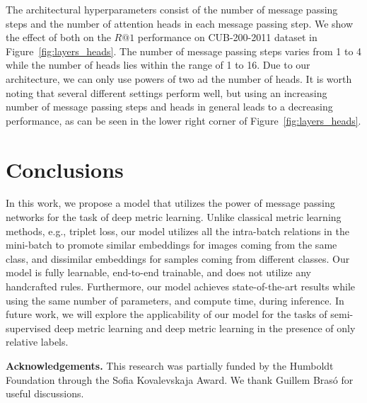\documentclass{article}
\begin{document}


The architectural hyperparameters consist of the number of message passing steps and the number of attention heads in each message passing step. We show the effect of both on the $R@1$ performance on CUB-200-2011 dataset in Figure~\ref{fig:layers_heads}. The number of message passing steps varies from 1 to 4 while the number of heads lies within the range of 1 to 16. Due to our architecture, we can only use powers of two ad the number of heads. It is worth noting that several different settings perform well, but using an increasing number of message passing steps and heads in general leads to a decreasing performance, as can be seen in the lower right corner of Figure~\ref{fig:layers_heads}.
\fi
 
\vspace{0.2cm}
\section{Conclusions}
\vspace{0.2cm}

In this work, we propose a model that utilizes the power of message passing networks for the task of deep metric learning. Unlike classical metric learning methods, e.g., triplet loss, our model utilizes all the intra-batch relations in the mini-batch to promote similar embeddings for images coming from the same class, and dissimilar embeddings for samples coming from different classes. Our model is fully learnable, end-to-end trainable, and does not utilize any handcrafted rules. Furthermore, our model achieves state-of-the-art results while using the same number of parameters, and compute time, during inference. In future work, we will explore the applicability of our model for the tasks of semi-supervised deep metric learning and deep metric learning in the presence of only relative labels. 

\textbf{Acknowledgements.} This research was partially funded by the Humboldt Foundation through the Sofia Kovalevskaja Award. We thank Guillem Bras\'{o} for useful discussions.
 \appendix
\end{document}
